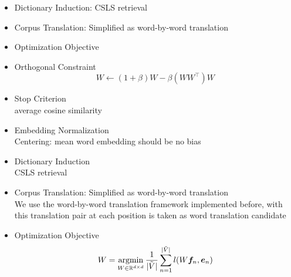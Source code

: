 \documentclass[11pt, a4paper, landscape]{article}
\newcommand*{\argmin}{\ensuremath{\operatornamewithlimits{argmin}}\xspace}
\begin{document}
	\vfill	
	
	\NewPage
	\vfill
	\begin{itemize}
		\item Dictionary Induction: CSLS retrieval
		
		\item Corpus Translation: Simplified as word-by-word translation
		
		\item Optimization Objective 
		\item Orthogonal Constraint
		\[ W \leftarrow (1+\beta) W - \beta(WW^\top)W\] 
		\item Stop Criterion\\
		average cosine similarity
			
	\end{itemize}
	\vfill

	\NewPage
	\vfill
	\begin{itemize}
		\item Embedding Normalization\\
		Centering: mean word embedding should be no bias
		\item Dictionary Induction\\
		 CSLS retrieval
		\item Corpus Translation: Simplified as word-by-word translation\\
		We use the word-by-word translation framework implemented before, with this translation pair at each position is taken as word translation candidate 
		
		\item Optimization Objective \\
	\[ W = \argmin_{W \in \mathbb{R}^{d \times d}} \frac{1}{{\lvert \tilde{V} \rvert}} \sum_{n=1}^{\lvert \tilde{V} \rvert} l(W\bm{f}_n, \bm{e}_n) \]
		
	\end{itemize}
	\vfill	
	
\end{document}
